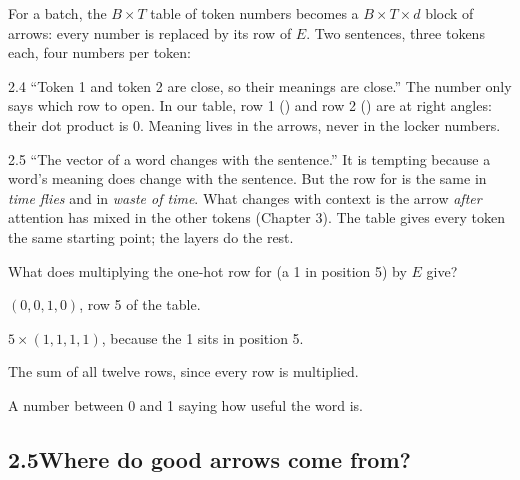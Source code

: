 For a batch, the $B\times T$ table of token numbers becomes a $B\times T\times d$ block of arrows: every
number is replaced by its row of $E$. Two sentences, three tokens each, four numbers per token:
\begin{center}\end{center}

\begin{wrongidea}{2.4}
``Token 1 and token 2 are close, so their meanings are close.'' The number only says which row to open.
In our table, row 1 () and row 2 () are at right angles: their dot product is 0. Meaning
lives in the arrows, never in the locker numbers.
\end{wrongidea}

\begin{wrongidea}{2.5}
``The vector of a word changes with the sentence.'' It is tempting because a word's meaning does
change with the sentence. But the row for  is the same in \emph{time flies} and in
\emph{waste of time}. What changes with context is the arrow \emph{after} attention has mixed in the other
tokens (Chapter 3). The table gives every token the same starting point; the layers do the rest.
\end{wrongidea}

\begin{checkq}
What does multiplying the one-hot row for  (a 1 in position 5) by $E$ give?
\begin{options}
\item $(0,0,1,0)$, row 5 of the table.
\item $5\times(1,1,1,1)$, because the 1 sits in position 5.
\item The sum of all twelve rows, since every row is multiplied.
\item A number between 0 and 1 saying how useful the word is.
\end{options}
\end{checkq}


\subsection*{2.5\quad Where do good arrows come from?}

